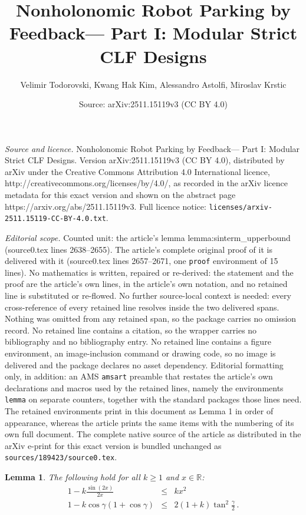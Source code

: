 \documentclass[10pt,a4paper]{amsart}
\title{Nonholonomic Robot Parking by Feedback--- Part I: Modular Strict CLF Designs}
\author{Velimir Todorovski, Kwang Hak Kim, Alessandro Astolfi, Miroslav Krstic}
\date{Source: arXiv:2511.15119v3 (CC BY 4.0)}
\newtheorem{lemma}{Lemma}
\begin{document}
\maketitle

\noindent\emph{Source and licence.} Nonholonomic Robot Parking by Feedback--- Part I: Modular Strict CLF Designs. Version arXiv:2511.15119v3 (CC BY 4.0), distributed by arXiv under the Creative Commons Attribution 4.0 International licence, http://creativecommons.org/licenses/by/4.0/, as recorded in the arXiv licence metadata for this exact version and shown on the abstract page https://arxiv.org/abs/2511.15119v3. Full licence notice: \texttt{licenses/arxiv-2511.15119-CC-BY-4.0.txt}.\par\smallskip

\noindent\textit{Editorial scope.} Counted unit: the article's lemma lemma:sinterm\_upperbound (source0.tex lines 2638--2655). The article's complete original proof of it is delivered with it (source0.tex lines 2657--2671, one \texttt{proof} environment of 15 lines). No mathematics is written, repaired or re-derived: the statement and the proof are the article's own lines, in the article's own notation, and no retained line is substituted or re-flowed.  No further source-local context is needed: every cross-reference of every retained line resolves inside the two delivered spans.  Nothing was omitted from any retained span, so the package carries no omission record.  No retained line contains a citation, so the wrapper carries no bibliography and no bibliography entry.  No retained line contains a figure environment, an image-inclusion command or drawing code, so no image is delivered and the package declares no asset dependency.  Editorial formatting only, in addition: an AMS \texttt{amsart} preamble that restates the article's own declarations and macros used by the retained lines, namely the environments \texttt{lemma} on separate counters, together with the standard packages those lines need.  The retained environments print in this document as Lemma 1 in order of appearance, whereas the article prints the same items with the numbering of its own full document.  The complete native source of the article as distributed in the arXiv e-print for this exact version is bundled unchanged as \texttt{sources/189423/source0.tex}.
\begin{lemma}\label{lemma:sinterm_upperbound}
The following hold for all $k\geq 1$ and $x\in\mathbb{R}$:
\begin{eqnarray}
1-k \frac{\sin(2x)}{2x} &\le& k x^2 \label{eq:bound1}
\\ 
1-  
k \cos\gamma(1+\cos\gamma) &\leq& 2 (1 + k)  \tan^2\frac{\gamma}{2}\,. \label{eq:bound2}
\end{eqnarray} 
\end{lemma}
\end{document}
